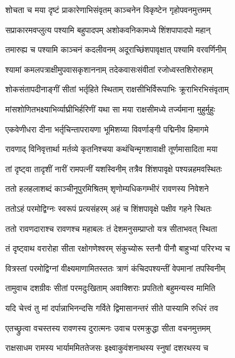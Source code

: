 \twolineshloka
{शोचता च मया दृष्टं प्राकारेणाभिसंवृतम्}
{काञ्चनेन विकृष्टेन गृहोपवनमुत्तमम्} %

\twolineshloka
{सप्राकारमवप्लुत्य पश्यामि बहुपादपम्}
{अशोकवनिकामध्ये शिंशपापादपो महान्} %

\twolineshloka
{तमारुह्य च पश्यामि काञ्चनं कदलीवनम्}
{अदूराच्छिंशपावृक्षात् पश्यामि वरवर्णिनीम्} %

\twolineshloka
{श्यामां कमलपत्राक्षीमुपवासकृशाननाम्}
{तदेकवासःसंवीतां रजोध्वस्तशिरोरुहाम्} %

\twolineshloka
{शोकसंतापदीनाङ्गीं सीतां भर्तृहिते स्थिताम्}
{राक्षसीभिर्विरूपाभिः क्रूराभिरभिसंवृताम्} %

\twolineshloka
{मांसशोणितभक्ष्याभिर्व्याघ्रीभिर्हरिणीं यथा}
{सा मया राक्षसीमध्ये तर्ज्यमाना मुहुर्मुहुः} %

\twolineshloka
{एकवेणीधरा दीना भर्तृचिन्तापरायणा}
{भूमिशय्या विवर्णाङ्गी पद्मिनीव हिमागमे} %

\twolineshloka
{रावणाद् विनिवृत्तार्था मर्तव्ये कृतनिश्चया}
{कथंचिन्मृगशावाक्षी तूर्णमासादिता मया} %

\twolineshloka
{तां दृष्ट्वा तादृशीं नारीं रामपत्नीं यशस्विनीम्}
{तत्रैव शिंशपावृक्षे पश्यन्नहमवस्थितः} %

\twolineshloka
{ततो हलहलाशब्दं काञ्चीनूपुरमिश्रितम्}
{शृणोम्यधिकगम्भीरं रावणस्य निवेशने} %

\twolineshloka
{ततोऽहं परमोद्विग्नः स्वरूपं प्रत्यसंहरम्}
{अहं च शिंशपावृक्षे पक्षीव गहने स्थितः} %

\twolineshloka
{ततो रावणदाराश्च रावणश्च महाबलः}
{तं देशमनुसम्प्राप्तो यत्र सीताभवत् स्थिता} %

\twolineshloka
{तं दृष्ट्वाथ वरारोहा सीता रक्षोगणेश्वरम्}
{संकुच्योरू स्तनौ पीनौ बाहुभ्यां परिरभ्य च} %

\twolineshloka
{वित्रस्तां परमोद्विग्नां वीक्ष्यमाणामितस्ततः}
{त्राणं कंचिदपश्यन्तीं वेपमानां तपस्विनीम्} %

\twolineshloka
{तामुवाच दशग्रीवः सीतां परमदुःखिताम्}
{अवाक्शिराः प्रपतितो बहुमन्यस्व मामिति} %

\twolineshloka
{यदि चेत्त्वं तु मां दर्पान्नाभिनन्दसि गर्विते}
{द्विमासानन्तरं सीते पास्यामि रुधिरं तव} %

\twolineshloka
{एतच्छ्रुत्वा वचस्तस्य रावणस्य दुरात्मनः}
{उवाच परमक्रुद्धा सीता वचनमुत्तमम्} %

\twolineshloka
{राक्षसाधम रामस्य भार्याममिततेजसः}
{इक्ष्वाकुवंशनाथस्य स्नुषां दशरथस्य च} %


